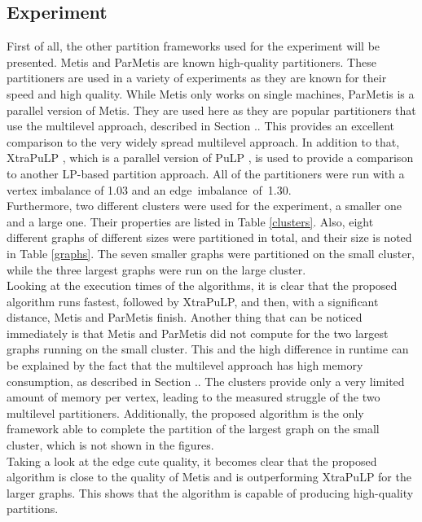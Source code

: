 \documentclass[acmsmall,nonacm,screen,review]{acmart}
\begin{document}
\subsection{Experiment}
First of all, the other partition frameworks used for the experiment will be presented. Metis \cite{Metis} and ParMetis \cite{ParMetis} are known high-quality partitioners. These partitioners are used in a variety of experiments as they are known for their speed and high quality. While Metis only works on single machines, ParMetis is a parallel version of Metis. They are used here as they are popular partitioners that use the multilevel approach, described in Section .. This provides an excellent comparison to the very widely spread multilevel approach. In addition to that, XtraPuLP \cite{XtraPuLP}, which is a parallel version of PuLP \cite{PuLP}, is used to provide a comparison to another LP-based partition approach. All of the partitioners were run with a vertex imbalance of 1.03 and an \hbox{edge imbalance of 1.30.} \\
Furthermore, two different clusters were used for the experiment, a smaller one and a large one. Their properties are listed in Table \ref{clusters}. Also, eight different graphs of different sizes were partitioned in total, and their size is noted in Table \ref{graphs}. The seven smaller graphs were partitioned on the small cluster, while the three largest graphs were run on the large cluster. \\
Looking at the execution times of the algorithms, it is clear that the proposed algorithm runs fastest, followed by XtraPuLP, and then, with a significant distance, Metis and ParMetis finish. Another thing that can be noticed immediately is that Metis and ParMetis did not compute for the two largest graphs running on the small cluster. This and the high difference in runtime can be explained by the fact that the multilevel approach has high memory consumption, as described in Section .. The clusters provide only a very limited amount of memory per vertex, leading to the measured struggle of the two multilevel partitioners. Additionally, the proposed algorithm is the only framework able to complete the partition of the largest graph on the small cluster, which is not shown in the figures. \\
Taking a look at the edge cute quality, it becomes clear that the proposed algorithm is close to the quality of Metis and is outperforming XtraPuLP for the larger graphs. This shows that the algorithm is capable of producing high-quality partitions. \\
\end{document}
